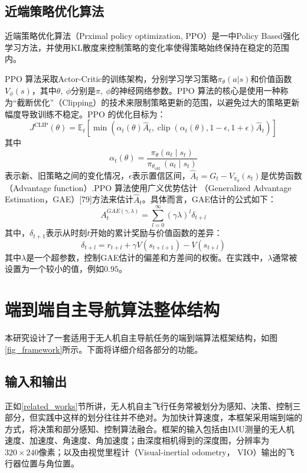 \subsection{近端策略优化算法}
近端策略优化算法（Prximal policy optimization, PPO）是一中Policy Based强化学习方法，并使用KL散度来控制策略的变化率使得策略始终保持在稳定的范围内。

PPO 算法采取Actor-Critic的训练架构，分别学习学习策略$\pi_\theta(a|s)$和价值函数$V_\phi(s)$，其中$\theta,\ \phi$分别是$\pi,\ \phi$的神经网络参数。PPO 算法的核心是使用一种称为“截断优化”（Clipping）的技术来限制策略更新的范围，以避免过大的策略更新幅度导致训练不稳定。PPO 的优化目标为：
\[
  J^{\mathrm{CLIP}}(\theta)=\mathbb{E}_{t}\left[\min \left(\alpha_{t}(\theta) \hat{A}_{t}, \operatorname{clip}\left(\alpha_{t}(\theta), 1-\epsilon, 1+\epsilon\right) \hat{A}_{t}\right)\right]
\]
其中
\[
  \alpha_{t}(\theta)=\frac{\pi_{\theta}\left(a_{t} \mid s_{t}\right)}{\pi_{\theta_{\text {old }}}\left(a_{t} \mid s_{t}\right)}
\]
表示新、旧策略之间的变化情况，$\epsilon$表示置信区间，$\hat{A}_t = G_t-V_{\pi_\theta}(s_t)$是优势函数（Advantage function）.PPO 算法使用广义优势估计
（Generalized Advantage Estimation，GAE）[79]方法来估计$\hat{A}_t$。具体而言，GAE估计的公式如下：
\[
  A_{t}^{G A E(\gamma, \lambda)}=\sum_{l=0}^{\infty}(\gamma \lambda)^{l} \delta_{t+l}
\]
其中，$\delta_{t+1}$表示从时刻$t$开始的累计奖励与价值函数的差异：
\[
  \delta_{t+l}=r_{t+l}+\gamma V\left(s_{t+l+1}\right)-V\left(s_{t+l}\right)
\]
其中$\lambda$是一个超参数，控制GAE估计的偏差和方差间的权衡。在实践中，$\lambda$通常被设置为一个较小的值，例如$0.95$。

\section{端到端自主导航算法整体结构}
本研究设计了一套适用于无人机自主导航任务的端到端算法框架结构，如图\ref{fig_framework}所示。下面将详细介绍各部分的功能。

\subsection{输入和输出}
正如\ref{related_works}节所讲，无人机自主飞行任务常被划分为感知、决策、控制三部分，但实践中这样的划分往往并不绝对。为加快计算速度，本框架采用端到端的方式，将决策和部分感知、控制算法融合。框架的输入包括由IMU测量的无人机速度、加速度、角速度、角加速度；由深度相机得到的深度图，分辨率为$320\times240$像素；以及由视觉里程计（Visual-inertial odometry， VIO）输出的飞行器位置与角位置。

